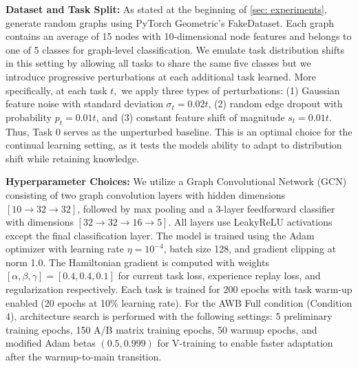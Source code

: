 \textbf{Dataset and Task Split:} As stated at the beginning of \cref{sec: experiments}, generate random graphs using PyTorch Geometric's FakeDataset. Each graph contains an average of 15 nodes with 10-dimensional node features and belongs to one of 5 classes for graph-level classification. We emulate task distribution shifts in this setting by allowing all tasks to share the same five classes but we introduce progressive perturbations at each additional task learned. More specifically, at each task $t,$ we apply three types of perturbations: (1) Gaussian feature noise with standard deviation $\sigma_t = 0.02t$, (2) random edge dropout with probability $p_t = 0.01t$, and (3) constant feature shift of magnitude $s_t = 0.01t$. Thus, Task $0$ serves as the unperturbed baseline. This is an optimal choice for the continual learning setting, as it tests the models ability to adapt to distribution shift while retaining knowledge.

\textbf{Hyperparameter Choices:} We utilize a Graph Convolutional Network (GCN) consisting of two graph convolution layers with hidden dimensions $[10 \rightarrow 32 \rightarrow 32]$, followed by max pooling and a 3-layer feedforward classifier with dimensions $[32 \rightarrow 32 \rightarrow 16 \rightarrow 5]$. All layers use LeakyReLU activations except the final classification layer. The model is trained using the Adam optimizer with learning rate $\eta = 10^{-4}$, batch size 128, and gradient clipping at norm 1.0. The Hamiltonian gradient is computed with weights $[\alpha, \beta, \gamma] = [0.4, 0.4, 0.1]$ for current task loss, experience replay loss, and regularization respectively. Each task is trained for 200 epochs with task warm-up enabled (20 epochs at 10\% learning rate). For the AWB Full condition (Condition 4), architecture search is performed with the following settings: 5 preliminary training epochs, 150 A/B matrix training epochs, 50 warmup epochs, and modified Adam betas $(0.5, 0.999)$ for V-training to enable faster adaptation after the warmup-to-main transition.




